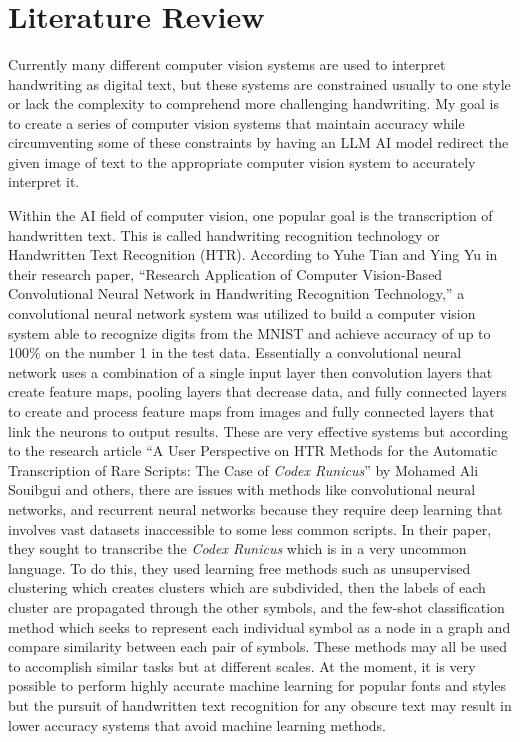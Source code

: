 \documentclass[12pt]{article}
\begin{document}
 

\begin{flushleft} 
 \\ 
 \\ 
 \\ 
\end{flushleft} 
\section{Literature Review}
Currently many different computer vision systems are used to interpret handwriting as digital text, but these systems are constrained usually to one style or lack the complexity to comprehend more challenging handwriting. My goal is to create a series of computer vision systems that maintain accuracy while circumventing some of these constraints by having an LLM AI model redirect the given image of text to the appropriate computer vision system to accurately interpret it. 

Within the AI field of computer vision, one popular goal is the transcription of handwritten text. This is called handwriting recognition technology or Handwritten Text Recognition (HTR). According to Yuhe Tian and Ying Yu in their research paper, “Research Application of Computer Vision-Based Convolutional Neural Network in Handwriting Recognition Technology,” a convolutional neural network system was utilized to build a computer vision system able to recognize digits from the MNIST and achieve accuracy of up to 100\% on the number 1 in the test data. Essentially a convolutional neural network uses a combination of a single input layer then convolution layers that create feature maps, pooling layers that decrease data, and fully connected layers to create and process feature maps from images and fully connected layers that link the neurons to output results. These are very effective systems but according to the research article “A User Perspective on HTR Methods for the Automatic Transcription of Rare Scripts: The Case of \emph{Codex Runicus}” by Mohamed Ali Souibgui and others, there are issues with methods like convolutional neural networks, and recurrent neural networks because they require deep learning that involves vast datasets inaccessible to some less common scripts. In their paper, they sought to transcribe the \emph{Codex Runicus} which is in a very uncommon language. To do this, they used learning free methods such as unsupervised clustering which creates clusters which are subdivided, then the labels of each cluster are propagated through the other symbols, and the few-shot classification method which seeks to represent each individual symbol as a node in a graph and compare similarity between each pair of symbols. These methods may all be used to accomplish similar tasks but at different scales. At the moment, it is very possible to perform highly accurate machine learning for popular fonts and styles but the pursuit of handwritten text recognition for any obscure text may result in lower accuracy systems that avoid machine learning methods.
\end{document}
